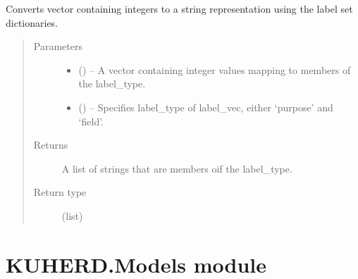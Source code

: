 \documentclass[letterpaper,10pt,english]{sphinxmanual}
\begin{document}
\begin{fulllineitems}
\label{\detokenize{KUHERD:KUHERD.LabelTransformations.vec2string}}
Converts vector containing integers to a string representation using the label set dictionaries.
\begin{quote}\begin{description}
\item[{Parameters}] \leavevmode\begin{itemize}
\item {} 
 () -- A vector containing integer values mapping to members of the label\_type.

\item {} 
 () -- Specifies label\_type of label\_vec, either `purpose' and `field'.

\end{itemize}

\item[{Returns}] \leavevmode
A list of strings that are members oif the label\_type.

\item[{Return type}] \leavevmode
(list)

\end{description}\end{quote}

\end{fulllineitems}



\section{KUHERD.Models module}
\label{\detokenize{KUHERD:module-KUHERD.Models}}\label{\detokenize{KUHERD:kuherd-models-module}}
\end{document}
